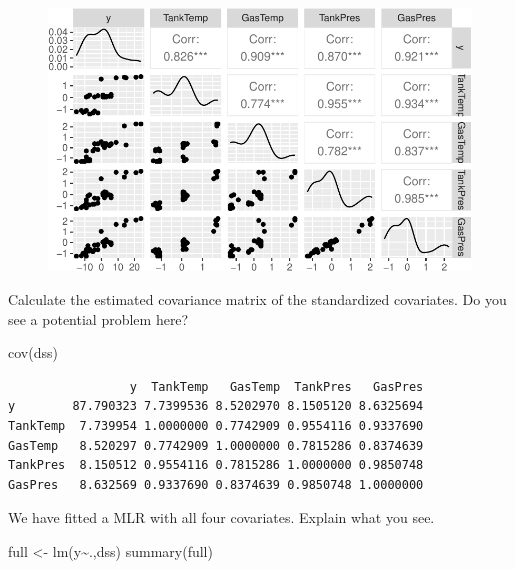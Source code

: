 \documentclass[
  letterpaper,
  DIV=11,
  numbers=noendperiod]{scrartcl}
\newenvironment{Shaded}{\begin{snugshade}}{\end{snugshade}}
\newcommand{\FunctionTok}[1]{\textcolor[rgb]{0.28,0.35,0.67}{#1}}
\newcommand{\NormalTok}[1]{\textcolor[rgb]{0.00,0.23,0.31}{#1}}
\newcommand{\OtherTok}[1]{\textcolor[rgb]{0.00,0.23,0.31}{#1}}
\newcommand{\SpecialCharTok}[1]{\textcolor[rgb]{0.37,0.37,0.37}{#1}}
\begin{document}
\begin{figure}[H]

{\centering \includegraphics{L7_files/figure-pdf/unnamed-chunk-4-1.pdf}

}

\end{figure}

Calculate the estimated covariance matrix of the standardized
covariates. Do you see a potential problem here?

\begin{Shaded}
\begin{Highlighting}[]
\FunctionTok{cov}\NormalTok{(dss)}
\end{Highlighting}
\end{Shaded}

\begin{verbatim}
                 y  TankTemp   GasTemp  TankPres   GasPres
y        87.790323 7.7399536 8.5202970 8.1505120 8.6325694
TankTemp  7.739954 1.0000000 0.7742909 0.9554116 0.9337690
GasTemp   8.520297 0.7742909 1.0000000 0.7815286 0.8374639
TankPres  8.150512 0.9554116 0.7815286 1.0000000 0.9850748
GasPres   8.632569 0.9337690 0.8374639 0.9850748 1.0000000
\end{verbatim}

We have fitted a MLR with all four covariates. Explain what you see.

\begin{Shaded}
\begin{Highlighting}[]
\NormalTok{full }\OtherTok{\textless{}{-}} \FunctionTok{lm}\NormalTok{(y}\SpecialCharTok{\textasciitilde{}}\NormalTok{.,dss)}
\FunctionTok{summary}\NormalTok{(full)}
\end{Highlighting}
\end{Shaded}
\end{document}
